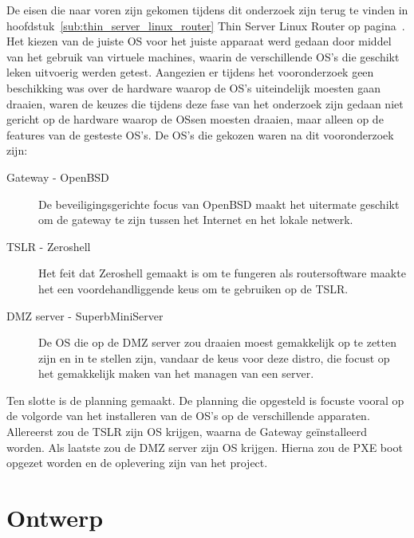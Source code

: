\documentclass[12pt]{article}
\begin{document}
De eisen die naar voren zijn gekomen tijdens dit onderzoek zijn terug te vinden in hoofdstuk~\ref{sub:thin_server_linux_router} Thin Server Linux Router op pagina~\pageref{sub:thin_server_linux_router}.\\

Het kiezen van de juiste OS voor het juiste apparaat werd gedaan door middel van het gebruik van virtuele machines, waarin de verschillende OS's die geschikt leken uitvoerig werden getest. Aangezien er tijdens het vooronderzoek geen beschikking was over de hardware waarop de OS's uiteindelijk moesten gaan draaien, waren de keuzes die tijdens deze fase van het onderzoek zijn gedaan niet gericht op de hardware waarop de OSsen moesten draaien, maar alleen op de features van de gesteste OS's. De OS's die gekozen waren na dit vooronderzoek zijn:
\begin{description}
\item[Gateway - OpenBSD] De beveiligingsgerichte focus van OpenBSD maakt het uitermate geschikt om de gateway te zijn tussen het Internet en het lokale netwerk.
\item[TSLR - Zeroshell] Het feit dat Zeroshell gemaakt is om te fungeren als routersoftware maakte het een voordehandliggende keus om te gebruiken op de TSLR.
\item[DMZ server - SuperbMiniServer] De OS die op de DMZ server zou draaien moest gemakkelijk op te zetten zijn en in te stellen zijn, vandaar de keus voor deze distro, die focust op het gemakkelijk maken van het managen van een server.
\end{description}
Ten slotte is de planning gemaakt. De planning die opgesteld is focuste vooral op de volgorde van het installeren van de OS's op de verschillende apparaten. Allereerst zou de TSLR zijn OS krijgen, waarna de Gateway ge\"installeerd worden. Als laatste zou de DMZ server zijn OS krijgen. Hierna zou de PXE boot opgezet worden en de oplevering zijn van het project.
\section{Ontwerp}
\end{document}
